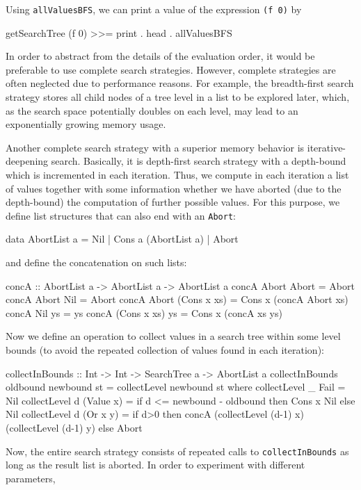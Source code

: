 \documentclass[english]{lni}
\newcommand{\code}[1]{\texttt{\small{}#1}}
\begin{document}
Using \code{allValuesBFS}, we can print a value
of the expression \code{(f 0)} by
%
\begin{curry}
getSearchTree (f 0) >>= print . head . allValuesBFS
\end{curry}
%
In order to abstract from the details of the evaluation order,
it would be preferable to use complete search strategies.
However, complete strategies are often neglected due to performance reasons.
For example, the breadth-first search strategy stores all child nodes 
of a tree level in a list to be explored later, which, as the search space
potentially doubles on each level, may lead to an exponentially
growing memory usage.

Another complete search strategy with a superior memory behavior
is iterative-deepening search.
Basically, it is depth-first search strategy with a depth-bound
which is incremented in each iteration.
Thus, we compute in each iteration a list of values
together with some information whether we have aborted
(due to the depth-bound) the computation of further possible values.
For this purpose, we define list structures that can also end
with an \code{Abort}:
%
\begin{curry}
data AbortList a = Nil | Cons a (AbortList a) | Abort
\end{curry}
%
and define the concatenation on such lists:
%
\begin{curry}
concA :: AbortList a -> AbortList a -> AbortList a
concA Abort       Abort       = Abort
concA Abort       Nil         = Abort
concA Abort       (Cons x xs) = Cons x (concA Abort xs)
concA Nil         ys          = ys
concA (Cons x xs) ys          = Cons x (concA xs ys)
\end{curry}
%
Now we define an operation to collect values in a search tree
within some level bounds (to avoid the repeated collection
of values found in each iteration):
%
\begin{curry}
collectInBounds :: Int -> Int -> SearchTree a -> AbortList a
collectInBounds oldbound newbound st = collectLevel newbound st
 where
  collectLevel _ Fail      = Nil
  collectLevel d (Value x) = if d <= newbound - oldbound
                             then Cons x Nil
                             else Nil
  collectLevel d (Or x y)  =
    if d>0
    then concA (collectLevel (d-1) x) (collectLevel (d-1) y)
    else Abort
\end{curry}
%
Now, the entire search strategy consists of
repeated calls to \code{collectInBounds} as long as the result list
is aborted. In order to experiment with different parameters,
\end{document}
